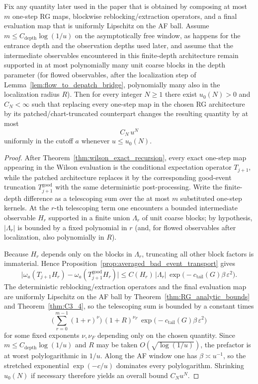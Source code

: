 \begin{proposition}\label{prop:depatch_finite_depth}
Fix any quantity later used in the paper that is obtained by composing at most $m$ one-step RG maps, blockwise reblocking/extraction operators, and a final evaluation map that is uniformly Lipschitz on the AF ball.
Assume $m\le C_{\mathrm{depth}}\log(1/u)$ on the asymptotically free window, as happens for the entrance depth and the observation depths used later, and assume that the intermediate observables encountered in this finite-depth architecture remain supported in at most polynomially many unit coarse blocks in the depth parameter
(for flowed observables, after the localization step of Lemma~\ref{lem:flow_to_depatch_bridge}, polynomially many also in the localization radius $R$).
Then for every integer $N\ge 1$ there exist $u_0(N)>0$ and $C_N<\infty$ such that replacing every one-step map in the chosen RG architecture by its patched/chart-truncated counterpart changes the resulting quantity by at most
\[
C_N\,u^N
\]
uniformly in the cutoff $a$ whenever $u\le u_0(N)$.
\end{proposition}

\begin{proof}
After Theorem~\ref{thm:wilson_exact_recursion}, every exact one-step map appearing in the Wilson evaluation is the conditional expectation operator $T_{j+1}$, while the patched architecture replaces it by the corresponding good-event truncation $T^{\mathrm{good}}_{j+1}$ with the same deterministic post-processing.
Write the finite-depth difference as a telescoping sum over the at most $m$ substituted one-step kernels.
At the $r$-th telescoping term one encounters a bounded intermediate observable $H_r$ supported in a finite union $\Lambda_r$ of unit coarse blocks; by hypothesis, $|\Lambda_r|$ is bounded by a fixed polynomial in $r$ (and, for flowed observables after localization, also polynomially in $R$).

Because $H_r$ depends only on the blocks in $\Lambda_r$, truncating all other block factors is immaterial.
Hence Proposition~\ref{prop:averaged_bad_event_transport} gives
\[
\big|\omega_a(T_{j+1}H_r)-\omega_a(T_{j+1}^{\mathrm{good}}H_r)\big|
\le
C(H_r)\,|\Lambda_r|\,\exp\!\big(-c_{\mathrm{tail}}(G)\beta\,\varepsilon^2\big).
\]
The deterministic reblocking/extraction operators and the final evaluation map are uniformly Lipschitz on the AF ball by Theorem~\ref{thm:RG_analytic_bounds} and Theorem~\ref{thm:C3_4}, so the telescoping sum is bounded by a constant times
\[
\Big(\sum_{r=0}^{m-1}(1+r)^{\nu}\Big)\,(1+R)^{\nu_F}\,\exp\!\big(-c_{\mathrm{tail}}(G)\beta\,\varepsilon^2\big)
\]
for some fixed exponents $\nu,\nu_F$ depending only on the chosen quantity.
Since $m\le C_{\mathrm{depth}}\log(1/u)$ and $R$ may be taken $O(\sqrt{\log(1/u)})$, the prefactor is at worst polylogarithmic in $1/u$.
Along the AF window one has $\beta\asymp u^{-1}$, so the stretched exponential $\exp(-c/u)$ dominates every polylogarithm.
Shrinking $u_0(N)$ if necessary therefore yields an overall bound $C_Nu^N$.
\end{proof}

